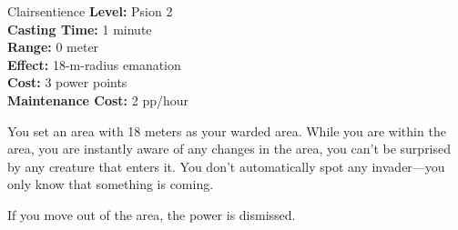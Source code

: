 {Clairsentience}
{
	\textbf{Level:}
	Psion 2\\
	\textbf{Casting Time:}
	1 minute\\
	\textbf{Range:}
	0 meter\\
	\textbf{Effect:}
	18-m-radius emanation\\
	\textbf{Cost:}
	3 power points\\
	\textbf{Maintenance Cost:}
	2 pp/hour\\
}
{
	You set an area with 18 meters as your warded area. While you are within the area, you are instantly aware of any changes in the area, you can't be surprised by any creature that enters it. You don't automatically spot any invader---you only know that something is coming.

	If you move out of the area, the power is dismissed.
}
